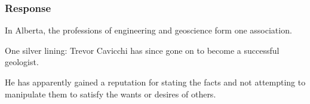 \begin{frame}
\frametitle{Response}

In Alberta, the professions of engineering and geoscience form one association.

One silver lining: Trevor Cavicchi has since gone on to become a successful geologist.

He has apparently gained a reputation for stating the facts and not attempting to manipulate them to satisfy the wants or desires of others.

\end{frame}






